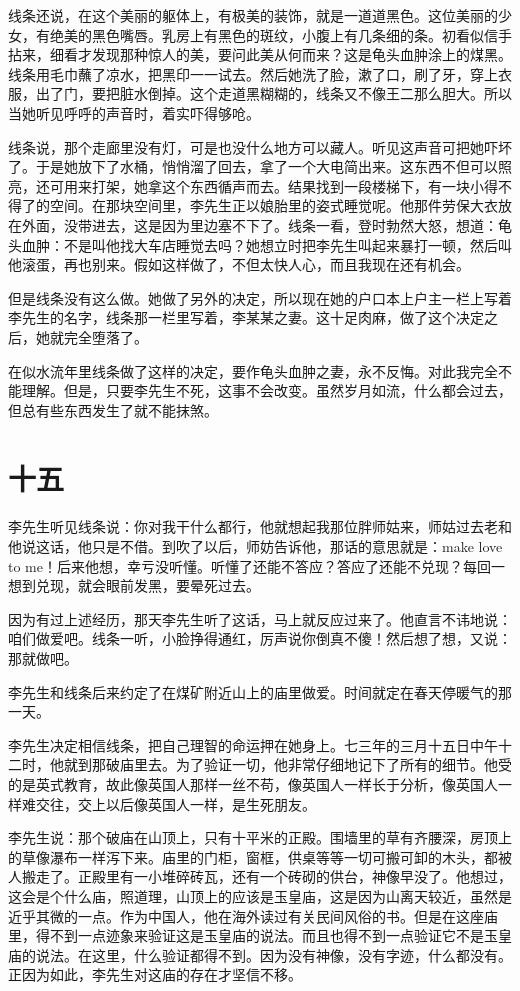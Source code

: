 线条还说，在这个美丽的躯体上，有极美的装饰，就是一道道黑色。这位美丽的少女，有绝美的黑色嘴唇。乳房上有黑色的斑纹，小腹上有几条细的条。初看似信手拈来，细看才发现那种惊人的美，要问此美从何而来？这是龟头血肿涂上的煤黑。线条用毛巾蘸了凉水，把黑印一一试去。然后她洗了脸，漱了口，刷了牙，穿上衣服，出了门，要把脏水倒掉。这个走道黑糊糊的，线条又不像王二那么胆大。所以当她听见呼呼的声音时，着实吓得够呛。 

线条说，那个走廊里没有灯，可是也没什么地方可以藏人。听见这声音可把她吓坏了。于是她放下了水桶，悄悄溜了回去，拿了一个大电简出来。这东西不但可以照亮，还可用来打架，她拿这个东西循声而去。结果找到一段楼梯下，有一块小得不得了的空间。在那块空间里，李先生正以娘胎里的姿式睡觉呢。他那件劳保大衣放在外面，没带进去，这是因为里边塞不下了。线条一看，登时勃然大怒，想道：龟头血肿：不是叫他找大车店睡觉去吗？她想立时把李先生叫起来暴打一顿，然后叫他滚蛋，再也别来。假如这样做了，不但太快人心，而且我现在还有机会。 

但是线条没有这么做。她做了另外的决定，所以现在她的户口本上户主一栏上写着李先生的名字，线条那一栏里写着，李某某之妻。这十足肉麻，做了这个决定之后，她就完全堕落了。 

在似水流年里线条做了这样的决定，要作龟头血肿之妻，永不反悔。对此我完全不能理解。但是，只要李先生不死，这事不会改变。虽然岁月如流，什么都会过去，但总有些东西发生了就不能抹煞。

\section{十五}

李先生听见线条说：你对我干什么都行，他就想起我那位胖师姑来，师姑过去老和他说这话，他只是不借。到吹了以后，师妨告诉他，那话的意思就是：make love to me！后来他想，幸亏没听懂。听懂了还能不答应？答应了还能不兑现？每回一想到兑现，就会眼前发黑，要晕死过去。 

因为有过上述经历，那天李先生听了这话，马上就反应过来了。他直言不讳地说：咱们做爱吧。线条一听，小脸挣得通红，厉声说你倒真不傻！然后想了想，又说：那就做吧。 

李先生和线条后来约定了在煤矿附近山上的庙里做爱。时间就定在春天停暖气的那一天。 

李先生决定相信线条，把自己理智的命运押在她身上。七三年的三月十五日中午十二时，他就到那破庙里去。为了验证一切，他非常仔细地记下了所有的细节。他受的是英式教育，故此像英国人那样一丝不苟，像英国人一样长于分析，像英国人一样难交往，交上以后像英国人一样，是生死朋友。 

李先生说：那个破庙在山顶上，只有十平米的正殿。围墙里的草有齐腰深，房顶上的草像瀑布一样泻下来。庙里的门柜，窗框，供桌等等一切可搬可卸的木头，都被人搬走了。正殿里有一小堆碎砖瓦，还有一个砖砌的供台，神像早没了。他想过，这会是个什么庙，照道理，山顶上的应该是玉皇庙，这是因为山离天较近，虽然是近乎其微的一点。作为中国人，他在海外读过有关民间风俗的书。但是在这座庙里，得不到一点迹象来验证这是玉皇庙的说法。而且也得不到一点验证它不是玉皇庙的说法。在这里，什么验证都得不到。因为没有神像，没有字迹，什么都没有。正因为如此，李先生对这庙的存在才坚信不移。 


